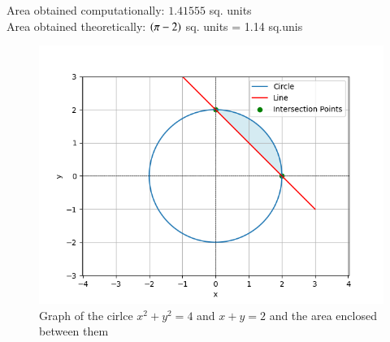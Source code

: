 \documentclass[journal]{IEEEtran}
\begin{document}
Area obtained computationally: $1.41555$ sq. units\\
Area obtained theoretically: $\left(\pi - 2\right)$ sq. units = 1.14 sq.unis
\begin{figure}[h!]
   \centering
   \includegraphics[width=1\columnwidth]{figs/fig.png}
   \caption{Graph of the cirlce $x^2 + y^2 = 4$ and $x + y = 2 $ and the area enclosed between them}
   \label{stemplot}
\end{figure}
\end{document}
